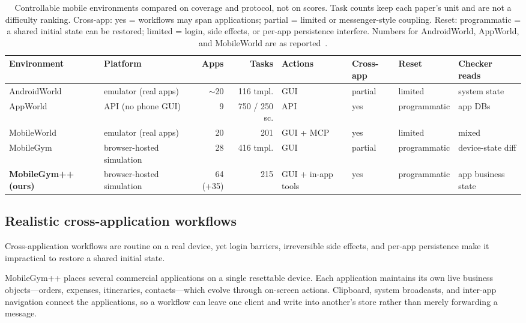 \begin{table}[t]
\caption{Controllable mobile environments compared on coverage and protocol, not on scores. Task counts keep each paper's unit and are not a difficulty ranking. Cross-app: yes = workflows may span applications; partial = limited or messenger-style coupling. Reset: programmatic = a shared initial state can be restored; limited = login, side effects, or per-app persistence interfere. Numbers for AndroidWorld, AppWorld, and MobileWorld are as reported~\citep{rawles2025androidworld,trivedi2024appworld,kong2025mobileworld}.}
\label{tab:mgpp-compare}
\begin{center}
\scriptsize
\setlength{\tabcolsep}{3.2pt}
\begin{tabular}{llrrllll}
\hline
Environment & Platform & Apps & Tasks & Actions & Cross-app & Reset & Checker reads \\
\hline
AndroidWorld & emulator (real apps) & $\sim$20 & 116 tmpl. & GUI & partial & limited & system state \\
AppWorld & API (no phone GUI) & 9 & 750 / 250 sc. & API & yes & programmatic & app DBs \\
MobileWorld & emulator (real apps) & 20 & 201 & GUI + MCP & yes & limited & mixed \\
MobileGym & browser-hosted simulation & 28 & 416 tmpl. & GUI & partial & programmatic & device-state diff \\
\textbf{MobileGym++ (ours)} & browser-hosted simulation & 64 (+35) & 215 & GUI + in-app tools & yes & programmatic & app business state \\
\hline
\end{tabular}
\end{center}
\end{table}

\subsection{Realistic cross-application workflows}
\label{sec:mgpp-crossapp}

Cross-application workflows are routine on a real device, yet login barriers, irreversible side effects, and per-app persistence make it impractical to restore a shared initial state.

MobileGym++ places several commercial applications on a single resettable device. Each application maintains its own live business objects---orders, expenses, itineraries, contacts---which evolve through on-screen actions. Clipboard, system broadcasts, and inter-app navigation connect the applications, so a workflow can leave one client and write into another's store rather than merely forwarding a message.

